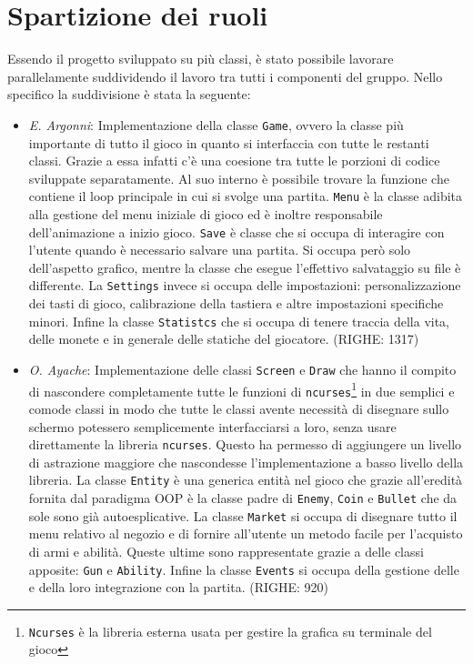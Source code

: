 \documentclass[a4paper]{article}
\begin{document}
\section{Spartizione dei ruoli}
Essendo il progetto sviluppato su più classi, è stato possibile lavorare 
parallelamente suddividendo il lavoro tra tutti i componenti del gruppo. Nello 
specifico la suddivisione è stata la seguente:
\begin{itemize}
  \item \emph{E. Argonni}: Implementazione della classe \texttt{Game}, ovvero la 
    classe più importante di tutto il gioco in quanto si interfaccia con tutte 
    le restanti classi. Grazie a essa infatti c'è una coesione tra tutte le 
    porzioni di codice sviluppate separatamente. Al suo interno è possibile 
    trovare la funzione che contiene il loop principale in cui si  svolge una 
    partita. \texttt{Menu} è la classe adibita alla gestione del menu iniziale 
    di gioco ed è inoltre responsabile dell'animazione a inizio gioco.
    \texttt{Save} è classe che si occupa di interagire con l'utente quando è 
    necessario salvare una partita. Si occupa però solo dell'aspetto grafico, 
    mentre la classe che esegue l'effettivo salvataggio su file è differente. 
    La \texttt{Settings} invece si occupa delle impostazioni: personalizzazione 
    dei tasti di gioco, calibrazione della tastiera e altre impostazioni 
    specifiche minori. Infine la classe \texttt{Statistcs} che si occupa di 
    tenere traccia della vita, delle monete e in generale delle statiche del 
    giocatore. (RIGHE: 1317)

  \item \emph{O. Ayache}: Implementazione delle classi \texttt{Screen} e 
    \texttt{Draw} che hanno il compito di nascondere completamente tutte le 
    funzioni di \texttt{ncurses}\footnote{\texttt{Ncurses} è la libreria esterna 
    usata per gestire la grafica su terminale del gioco} in due semplici e 
    comode classi in modo che tutte le classi avente necessità di disegnare 
    sullo schermo potessero semplicemente interfacciarsi a loro, senza usare 
    direttamente la libreria \texttt{ncurses}. Questo ha permesso di aggiungere 
    un livello di astrazione maggiore che nascondesse l'implementazione a basso 
    livello della libreria. La classe \texttt{Entity} è una generica entità nel
    gioco che grazie all'eredità fornita dal paradigma OOP è la classe padre di
    \texttt{Enemy}, \texttt{Coin} e \texttt{Bullet} che da sole sono già 
    autoesplicative. La classe \texttt{Market} si occupa di disegnare tutto il 
    menu relativo al negozio e di fornire all'utente un metodo facile per 
    l'acquisto di armi e abilità. Queste ultime sono rappresentate grazie a
    delle classi apposite: \texttt{Gun} e \texttt{Ability}. Infine la classe 
    \texttt{Events} si occupa della gestione delle e della loro integrazione con
    la partita. (RIGHE: 920)


\end{itemize}
\end{document}
